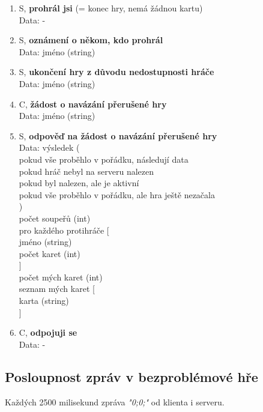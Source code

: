 \documentclass[12pt, a4paper]{article}
\begin{document}
\begin{enumerate}
		\item S, \textbf{prohrál jsi} (= konec hry, nemá žádnou kartu)\\
		Data: -

		\item S, \textbf{oznámení o někom, kdo prohrál}\\
		Data: jméno (string)

		\item S, \textbf{ukončení hry z důvodu nedostupnosti hráče}\\
		Data: jméno (string)

		\item C, \textbf{žádost o navázání přerušené hry}\\
		Data: jméno (string)

		\item S, \textbf{odpověď na žádost o navázání přerušené hry}\\
		Data: výsledek (\\
			\null {} pokud vše proběhlo v pořádku, následují data\\
			\null {} pokud hráč nebyl na serveru nalezen\\
			\null {} pokud byl nalezen, ale je aktivní\\
			\null \qquad pokud vše proběhlo v pořádku, ale hra ještě nezačala\\
			\null \quad )\\
			\null \quad počet soupeřů (int)\\
			\null \quad pro každého protihráče [\\
			\null \qquad jméno (string)\\
			\null \qquad počet karet (int)\\
			\null \quad ]\\
			\null \quad počet mých karet (int)\\
			\null \quad seznam mých karet [\\
			\null \qquad karta (string)\\
			\null \quad ]

		\item C, \textbf{odpojuji se}\\
		Data: -
		\end{enumerate}
		
	\subsection{Posloupnost zpráv v bezproblémové hře}
		Každých 2500 milisekund zpráva \emph{"0;0;"} od klienta i serveru.
		
\end{document}
